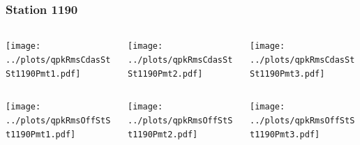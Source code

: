 \documentclass[aspectratio=169]{beamer}
\begin{document}
\begin{frame} 
  \frametitle{Station 1190}
  \begin{center}
    \begin{columns}
      \begin{column}{0.33\textwidth}
        \texttt{[image: ../plots/qpkRmsCdasStSt1190Pmt1.pdf]}
      \end{column}
      \begin{column}{0.33\textwidth}
        \texttt{[image: ../plots/qpkRmsCdasStSt1190Pmt2.pdf]}
      \end{column}
      \begin{column}{0.33\textwidth}
        \texttt{[image: ../plots/qpkRmsCdasStSt1190Pmt3.pdf]}
      \end{column}
    \end{columns}
  \end{center}

  \begin{center}
    \begin{columns}
      \begin{column}{0.33\textwidth}
        \texttt{[image: ../plots/qpkRmsOffStSt1190Pmt1.pdf]}
      \end{column}
      \begin{column}{0.33\textwidth}
        \texttt{[image: ../plots/qpkRmsOffStSt1190Pmt2.pdf]}
      \end{column}
      \begin{column}{0.33\textwidth}
        \texttt{[image: ../plots/qpkRmsOffStSt1190Pmt3.pdf]}
      \end{column}
    \end{columns}
  \end{center}
\end{frame}
\end{document}
